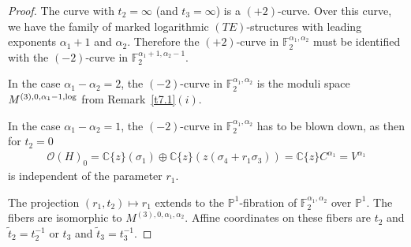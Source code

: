 \documentclass[pdftex]{sigma}%
\numberwithin{equation}{section}
\numberwithin{figure}{section}
\newcommand{\C}{{\mathbb C}}
\renewcommand{\P}{{\mathbb P}}
\newcommand{\F}{{\mathbb F}}
\newcommand{\OO}{{\mathcal O}}
\newcommand{\www}{\widetilde}
\begin{document}
\begin{proof}
The curve with $t_2=\infty$ (and $t_3=\infty$)
is a $(+2)$-curve.
Over this curve, we have the family of marked logarithmic
$(TE)$-structures with
leading exponents $\alpha_1+1$ and $\alpha_2$.
Therefore the $(+2)$-curve in $\F_2^{\alpha_1,\alpha_2}$
must be identified with the $(-2)$-curve in
$\F_2^{\alpha_1+1,\alpha_2-1}$.

In the case $\alpha_1-\alpha_2=2$, the $(-2)$-curve
in $\F_2^{\alpha_1,\alpha_2}$ is the moduli space
$M^{(3),0,\alpha_1-1,{\rm log}}$ from Remark~\ref{t7.1}$(i)$.

In the case $\alpha_1-\alpha_2=1$, the $(-2)$-curve
in $\F_2^{\alpha_1,\alpha_2}$ has to be blown down,
as then for $t_2=0$
\begin{gather*}
\OO(H)_0=\C\{z\}(\sigma_1)\oplus\C\{z\}(z(\sigma_4+r_1\sigma_3))
=\C\{z\}C^{\alpha_1}=V^{\alpha_1}
\end{gather*}
is independent of the parameter $r_1$.

The projection $(r_1,t_2)\mapsto r_1$ extends
to the $\P^1$-fibration of $\F_2^{\alpha_1,\alpha_2}$
over $\P^1$.
The fibers are isomorphic to $M^{(3),0,\alpha_1,\alpha_2}$.
Affine coordinates on these fibers are $t_2$
and $\www t_2=t_2^{-1}$ or $t_3$ and $\www t_3=t_3^{-1}$.
\end{proof}
\end{document}
